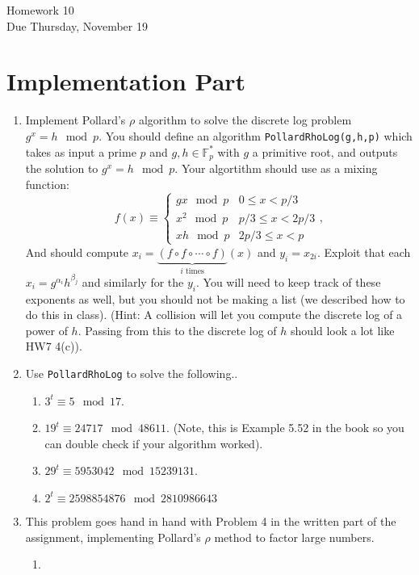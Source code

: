 \documentclass[11pt]{article}
\newcommand{\bF}{\mathbb{F}}
\begin{document}
\begin{center}
\Large {Homework 10}\\
\small {Due Thursday, November 19}
\end{center}
\section*{Implementation Part}
\begin{enumerate}
  \item{
  Implement Pollard's $\rho$ algorithm to solve the discrete log problem $g^x = h\mod p$.  You should define an algorithm \verb|PollardRhoLog(g,h,p)| which takes as input a prime $p$ and $g,h\in\bF_p^*$ with $g$ a primitive root, and outputs the solution to $g^x = h\mod p$.  Your algortithm should use as a mixing function:
  \[f(x)\equiv
  \begin{cases}
    gx \mod p & 0\le x <p/3\\
    x^2\mod p & p/3\le x< 2p/3\\
    xh\mod p & 2p/3\le x<p
  \end{cases},\]
  And should compute $x_i = \underbrace{(f\circ f\circ\cdots\circ f)}_{i\text{ times}}(x)$ and $y_i = x_{2i}$.  Exploit that each $x_i = g^{\alpha_i}h^{\beta_j}$ and similarly for the $y_i$.  You will need to keep track of these exponents as well, but you should not be making a list (we described how to do this in class).  (Hint: A collision will let you compute the discrete log of a power of $h$.  Passing from this to the discrete log of $h$ should look a lot like HW7 4(c)).
  }
  \item{
  Use \verb|PollardRhoLog| to solve the following..
  \begin{enumerate}
    \item{
    $3^t\equiv 5\mod 17$.
    }
    \item{
    $19^t \equiv 24717\mod48611$.  (Note, this is Example 5.52 in the book so you can double check if your algorithm worked).
    }
    \item{
    $29^t \equiv 5953042 \mod15239131$.
    }
    \item{
    $2^t \equiv 2598854876 \mod2810986643$
    }
  \end{enumerate}
  }
  \item{
  This problem goes hand in hand with Problem 4 in the written part of the assignment, implementing Pollard's $\rho$ method to factor large numbers.
  \begin{enumerate}
    \item{
}
\end{enumerate}}
\end{enumerate}
\end{document}

